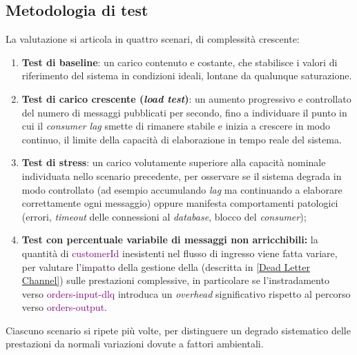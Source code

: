 \subsection{Metodologia di test}
\label{Metodologia di test}
La valutazione si articola in quattro scenari, di complessità crescente:
\begin{enumerate}
    \item \textbf{Test di baseline}: un carico contenuto e costante, che stabilisce i valori di riferimento del sistema in condizioni ideali, lontane da qualunque saturazione.
    \item \textbf{Test di carico crescente (\textit{load test})}: un aumento progressivo e controllato del numero di messaggi pubblicati per secondo, fino a individuare il punto in cui il \textit{consumer lag} smette di rimanere stabile e inizia a crescere in modo continuo, il limite della capacità di elaborazione in tempo reale del sistema.
    \item \textbf{Test di stress}: un carico volutamente superiore alla capacità nominale individuata nello scenario precedente, per osservare se il sistema degrada in modo controllato (ad esempio accumulando \textit{lag} ma continuando a elaborare correttamente ogni messaggio) oppure manifesta comportamenti patologici (errori, \textit{timeout} delle connessioni al \textit{database}, blocco del \textit{consumer});
    \item \textbf{Test con percentuale variabile di messaggi non arricchibili:} la quantità di \textcolor{purple}{customerId} inesistenti nel flusso di ingresso viene fatta variare, per valutare l'impatto della gestione della  (descritta in \ref{Dead Letter Channel}) sulle prestazioni complessive, in particolare se l'instradamento verso \textcolor{purple}{orders-input-dlq} introduca un \textit{overhead} significativo rispetto al percorso verso \textcolor{purple}{orders-output}.
\end{enumerate}
Ciascuno scenario si ripete più volte, per distinguere un degrado sistematico delle prestazioni da normali variazioni dovute a fattori ambientali.

\newpage
